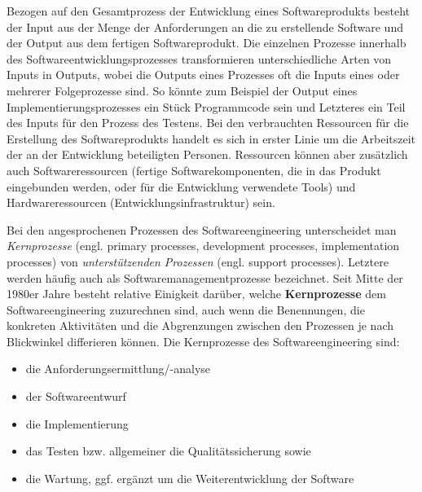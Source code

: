 Bezogen auf den Gesamtprozess der Entwicklung eines Softwareprodukts besteht der Input aus der Menge der Anforderungen an die zu erstellende Software und der Output aus dem fertigen Softwareprodukt. Die einzelnen Prozesse innerhalb des Softwareentwicklungsprozesses transformieren unterschiedliche Arten von Inputs in Outputs, wobei die Outputs eines Prozesses oft die Inputs eines oder mehrerer Folgeprozesse sind. So könnte zum Beispiel der Output eines Implementierungsprozesses ein Stück Programmcode sein und Letzteres ein Teil des Inputs für den Prozess des Testens. Bei den verbrauchten Ressourcen für die Erstellung des Softwareprodukts handelt es sich in erster Linie um die Arbeitszeit der an der Entwicklung beteiligten Personen. Ressourcen können aber zusätzlich auch Softwareressourcen (\zb fertige Softwarekomponenten, die in das Produkt eingebunden werden, oder für die Entwicklung verwendete Tools) und Hardwareressourcen (\zb Entwicklungsinfrastruktur) sein. 


Bei den angesprochenen Prozessen 
des Softwareengineering unterscheidet man \textit{Kernprozesse} (engl. primary processes, development processes, implementation processes) von \textit{unterstützenden Prozessen} (engl. support processes). Letztere werden häufig auch als Softwaremanagementprozesse bezeichnet. Seit Mitte der 1980er Jahre besteht relative Einigkeit darüber, welche \textbf{Kernprozesse} dem Softwareengineering zuzurechnen sind, auch wenn die Benennungen, die konkreten Aktivitäten und die Abgrenzungen zwischen den Prozessen je nach Blickwinkel differieren können. Die Kernprozesse des Softwareengineering sind:
\begin{itemize}
	\item die Anforderungsermittlung/-analyse
	\item der Softwareentwurf
	\item die Implementierung
	\item das Testen bzw. allgemeiner die Qualitätssicherung sowie
	\item die Wartung, ggf. ergänzt um die Weiterentwicklung der Software
\end{itemize}


